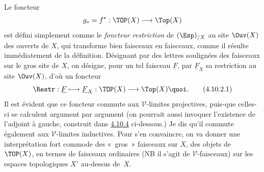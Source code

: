 \documentclass[10pt]{../fichiers-configuration-latex/smfart}
\begin{document}
\subsubsection{}
Le foncteur
$$
g_{\ast}=f^{\ast}:\TOP(X)\longrightarrow \Top(X)
$$
est défini simplement comme le \emph{foncteur restriction} de
$(\Esp)_{/X}$ au site $\Ouv(X)$ des ouverts de $X$, qui transforme
bien faisceaux en faisceaux, comme il résulte immédiatement de
la définition. Désignant par des lettres soulignées des
faisceaux sur le gros site de $X$, on désigne, pour un tel
faisceau $\underline{F}$, par $\underline{F}_X$ sa restriction au site
$\Ouv(X)$, d'où un foncteur
\begin{equation*}
\Restr:\underline{F}\longmapsto \underline{F}_X:\TOP(X)\longrightarrow
\Top(X){\quoi}.\tag{4.10.2.1}
\end{equation*}
Il est évident que ce foncteur commute aux $𝒱$-limites
projectives, puis-que celles-ci se calculent argument par argument
(on pourrait aussi invoquer l'existence de l'adjoint à gauche,
construit dans \hyperref[IV.subsubsec4.10.4]{4.10.4} ci-dessous.) Je dis qu'il
commute également aux $𝒱$-limites inductives. Pour s'en
convaincre, on va donner une interprétation fort commode des « gros »  faisceaux sur $X$, \ie des objets de $\TOP(X)$, en termes
de faisceaux ordinaires (NB il s'agit de $𝒱$-faisceaux) sur
les espaces topologiques $X'$ au-dessus de~$X$.
\end{document}
